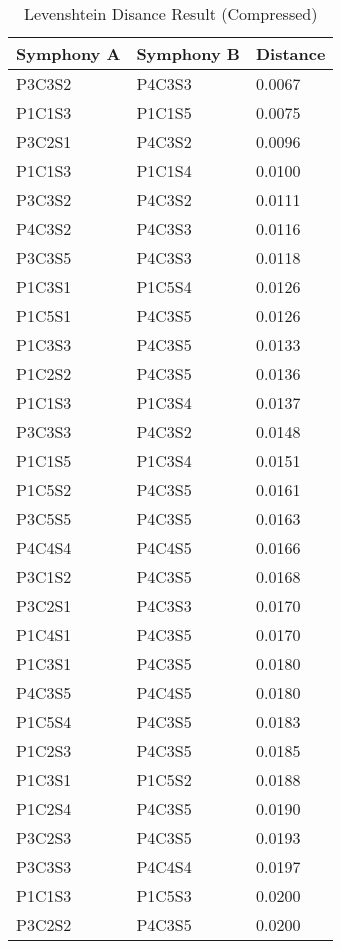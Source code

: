 \begin{longtable}{|l|l|l|}
\caption{Levenshtein Disance Result (Compressed)}
\label{my-label}\\
\hline
Symphony A & Symphony B & Distance \\ \hline
\endfirsthead
%
\endhead
%
P3C3S2 & P4C3S3 & 0.0067 \\ \hline
P1C1S3 & P1C1S5 & 0.0075 \\ \hline
P3C2S1 & P4C3S2 & 0.0096 \\ \hline
P1C1S3 & P1C1S4 & 0.0100 \\ \hline
P3C3S2 & P4C3S2 & 0.0111 \\ \hline
P4C3S2 & P4C3S3 & 0.0116 \\ \hline
P3C3S5 & P4C3S3 & 0.0118 \\ \hline
P1C3S1 & P1C5S4 & 0.0126 \\ \hline
P1C5S1 & P4C3S5 & 0.0126 \\ \hline
P1C3S3 & P4C3S5 & 0.0133 \\ \hline
P1C2S2 & P4C3S5 & 0.0136 \\ \hline
P1C1S3 & P1C3S4 & 0.0137 \\ \hline
P3C3S3 & P4C3S2 & 0.0148 \\ \hline
P1C1S5 & P1C3S4 & 0.0151 \\ \hline
P1C5S2 & P4C3S5 & 0.0161 \\ \hline
P3C5S5 & P4C3S5 & 0.0163 \\ \hline
P4C4S4 & P4C4S5 & 0.0166 \\ \hline
P3C1S2 & P4C3S5 & 0.0168 \\ \hline
P3C2S1 & P4C3S3 & 0.0170 \\ \hline
P1C4S1 & P4C3S5 & 0.0170 \\ \hline
P1C3S1 & P4C3S5 & 0.0180 \\ \hline
P4C3S5 & P4C4S5 & 0.0180 \\ \hline
P1C5S4 & P4C3S5 & 0.0183 \\ \hline
P1C2S3 & P4C3S5 & 0.0185 \\ \hline
P1C3S1 & P1C5S2 & 0.0188 \\ \hline
P1C2S4 & P4C3S5 & 0.0190 \\ \hline
P3C2S3 & P4C3S5 & 0.0193 \\ \hline
P3C3S3 & P4C4S4 & 0.0197 \\ \hline
P1C1S3 & P1C5S3 & 0.0200 \\ \hline
P3C2S2 & P4C3S5 & 0.0200 \\ \hline
\end{longtable}

